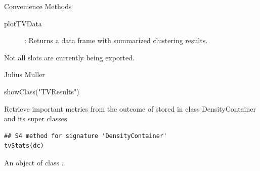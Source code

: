 \documentclass[letterpaper]{book}
\begin{document}
%
\begin{Section}{Convenience Methods}
\begin{description}

\item[plotTVData] : Returns a data frame with summarized clustering results.

\end{description}

\end{Section}
%
\begin{Note}
Not all slots are currently being exported.
\end{Note}
%
\begin{Author}
Julius Muller 
\end{Author}
%
\begin{SeeAlso}
\end{SeeAlso}
%
\begin{Examples}
\begin{ExampleCode}
showClass("TVResults")
\end{ExampleCode}
\end{Examples}
%
\begin{Description}
Retrieve important metrics from the outcome of  stored in class DensityContainer and its super classes.
\end{Description}
%
\begin{Usage}
\begin{verbatim}
## S4 method for signature 'DensityContainer'
tvStats(dc)
\end{verbatim}
\end{Usage}
%
\begin{Arguments}

\begin{ldescription}
\item[\code{dc}] 
An object of class .

\end{ldescription}
\end{Arguments}
%
\end{document}
